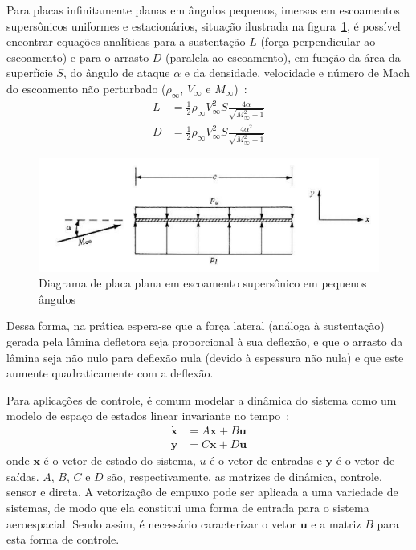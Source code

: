 Para placas infinitamente planas em ângulos pequenos, imersas em escoamentos supersônicos uniformes e estacionários, situação ilustrada na figura~\ref{fig:supersonic_flat_plate}, é possível encontrar equações analíticas para a sustentação \(L\) (força perpendicular ao escoamento) e para o arrasto \(D\) (paralela ao escoamento), em função da área da superfície \(S\), do ângulo de ataque \(\alpha \) e da densidade, velocidade e número de Mach do escoamento não perturbado (\(\rho_\infty \), \(V_\infty \) e \(M_\infty \))~\cite{anderson}:
\begin{align}
    L &= \frac{1}{2} \rho_\infty V_\infty^2 S \frac{4\alpha}{\sqrt{M_\infty^2-1}} \label{eq:sslift} \\
    D &= \frac{1}{2} \rho_\infty V_\infty^2 S \frac{4\alpha^2}{\sqrt{M_\infty^2-1}}
\end{align}

\begin{figure}[htbp]
    \centering
    \includegraphics[width=\textwidth]{img/supersonic_flat_plate.png}
    \caption{Diagrama de placa plana em escoamento supersônico em pequenos ângulos}\label{fig:supersonic_flat_plate}
\end{figure}

Dessa forma, na prática espera-se que a força lateral (análoga à sustentação) gerada pela lâmina defletora seja proporcional à sua deflexão, e que o arrasto da lâmina seja não nulo para deflexão nula (devido à espessura não nula) e que este aumente quadraticamente com a deflexão.

Para aplicações de controle, é comum modelar a dinâmica do sistema como um modelo de espaço de estados linear invariante no tempo~\cite{fbsys}:
\begin{align}
    \dot{\textbf{x}} &= A\textbf{x} + B\textbf{u} \\
    \textbf{y} &= C\textbf{x} + D\textbf{u}
\end{align}
onde \(\textbf{x}\) é o vetor de estado do sistema, \(u\) é o vetor de entradas e \(\textbf{y}\) é o vetor de saídas. \(A\), \(B\), \(C\) e \(D\) são, respectivamente, as matrizes de dinâmica, controle, sensor e direta. A vetorização de empuxo pode ser aplicada a uma variedade de sistemas, de modo que ela constitui uma forma de entrada para o sistema aeroespacial. Sendo assim, é necessário caracterizar o vetor \(\textbf{u}\) e a matriz \(B\) para esta forma de controle.

